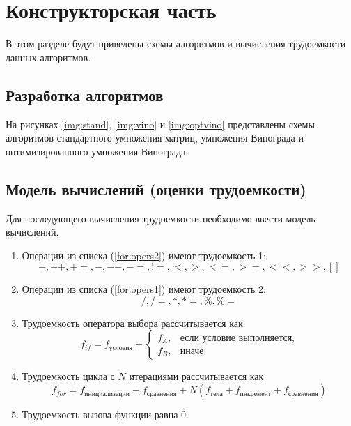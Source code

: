 \chapter{Конструкторская часть}
В этом разделе будут приведены схемы алгоритмов и вычисления трудоемкости данных алгоритмов.

\section{Разработка алгоритмов}

На рисунках  \ref{img:stand}, \ref{img:vino} и \ref{img:optvino} представлены схемы алгоритмов стандартного умножения матриц, умножения Винограда и оптимизированного умножения Винограда.



\FloatBarrier


\FloatBarrier


\FloatBarrier

\section{Модель вычислений (оценки трудоемкости)}

Для последующего вычисления трудоемкости необходимо ввести модель вычислений.
\begin{enumerate}
	\item Операции из списка (\ref{for:opers2}) имеют трудоемкость 1:
	\begin{equation}
		\label{for:opers2}
		+, ++, +=, -, {-}-, -=, !=, <, >, <=, >=, <<, >>, []
	\end{equation}
	\item Операции из списка (\ref{for:opers1}) имеют трудоемкость 2:
	\begin{equation}
		\label{for:opers1}
		/, /=, *, *= ,\%, \%=
	\end{equation}
	\item Трудоемкость оператора выбора  рассчитывается как
	\begin{equation}
		\label{for:if}
		f_{if} = f_{\text{условия}} +
		\begin{cases}
			f_A, & \text{если условие выполняется,}\\
			f_B, & \text{иначе.}
		\end{cases}
	\end{equation}
	\item Трудоемкость цикла с $N$ итерациями рассчитывается как
	\begin{equation}
		\label{for:for}
		f_{for} = f_{\text{инициализации}} + f_{\text{сравнения}} + N(f_{\text{тела}} + f_{\text{инкремент}} + f_{\text{сравнения}})
	\end{equation}
	\item Трудоемкость вызова функции равна 0.
\end{enumerate}

